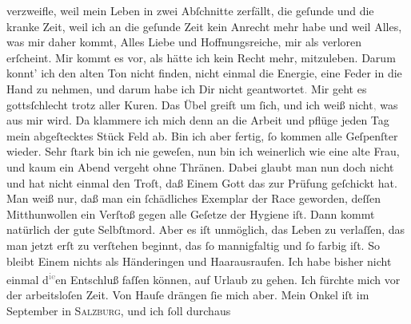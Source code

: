 \begin{ledgroupsized}[t]{13cm}
               verzweifle, weil mein Leben {\pb}in zwei Abſchnitte
               zerfällt, die geſunde und die kranke Zeit, weil ich an die geſunde Zeit kein Anrecht
               mehr habe und weil Alles, was mir daher kommt, Alles Liebe und Hoffnungsreiche, mir
               als verloren erſcheint. Mir kommt es vor, als hätte ich kein Recht mehr, mitzuleben.
               Darum konnt’ ich den alten Ton nicht finden, nicht einmal die Energie, eine Feder in
               die Hand zu nehmen, und darum habe ich Dir nicht geantwortet\textcolor{gray}{.} Mir
               geht es gottsſchlecht trotz aller Kuren. Das Übel greift um ſich, und ich weiß
                  nicht\textcolor{gray}{,} was aus mir wird. Da klammere ich mich denn an die
               Arbeit und pflüge jeden Tag mein abgeſtecktes Stück Feld ab. Bin ich aber fertig, ſo
               kommen alle Geſpenſter {\pb}wieder. Sehr ſtark bin ich
               nie geweſen, nun bin ich weinerlich wie eine alte Frau, und kaum ein Abend vergeht
               ohne Thränen. Dabei glaubt man nun doch nicht und hat nicht einmal den Troſt, daß
               Einem Gott das zur Prüfung geſchickt hat. Man weiß nur, daß man ein ſchädliches
               Exemplar der Race geworden, deſſen Mitthunwollen ein Verſtoß gegen alle Geſetze der
               Hygiene iſt. Dann kommt natürlich der gute Selbſtmord. Aber es iſt unmöglich, das
               Leben zu verlaſſen, das man jetzt erſt zu verſtehen beginnt, das ſo mannigfaltig und
               ſo farbig iſt. So bleibt Einem nichts als Händeringen und Haarausraufen.\pend
           \pstart
           Ich habe bisher nicht einmal d\substVorne{}\textsuperscript{\textcolor{gray}{ie}}\substDazwischen{}en\substHinten{} Entschluß faſſen können, auf Urlaub zu gehen. {\pb}Ich fürchte mich vor der arbeitsloſen Zeit. Von
               Hauſe drängen ſie mich aber. Mein Onkel iſt im September in \textsc{Salzburg}, und ich ſoll durchaus \label{K_L02711-2v}
\end{ledgroupsized}
